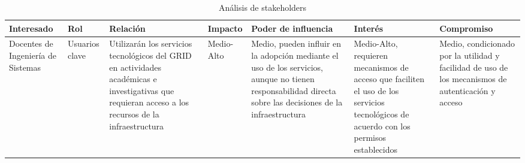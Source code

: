 \begin{table}[H]
	\centering
	\caption{Análisis de stakeholders}
	\label{tab:stakeholders}

	\renewcommand{\arraystretch}{1.25}
	\setlength{\tabcolsep}{4pt}
	\fontsize{7pt}{7pt}\selectfont

	\begin{tabularx}{\textwidth}{|
		>{\raggedright\arraybackslash}p{2.0cm}|
		>{\raggedright\arraybackslash}p{1.7cm}|
		>{\raggedright\arraybackslash}X|
		>{\raggedright\arraybackslash}p{1.5cm}|
		>{\raggedright\arraybackslash}X|
		>{\raggedright\arraybackslash}X|
		>{\raggedright\arraybackslash}p{2.0cm}|}

		\hline
		\textbf{Interesado}                                                                                                                                          &
		\textbf{Rol}                                                                                                                                                 &
		\textbf{Relación}                                                                                                                                            &
		\textbf{Impacto}                                                                                                                                             &
		\textbf{Poder de influencia}                                                                                                                                 &
		\textbf{Interés}                                                                                                                                             &
		\textbf{Compromiso}
		\\
		\hline

		Docentes de Ingeniería de Sistemas                                                                                                                           &
		Usuarios clave                                                                                                                                               &
		Utilizarán los servicios tecnológicos del \acs{GRID} en actividades académicas e investigativas que requieran acceso a los recursos de la infraestructura          &
		Medio-Alto                                                                                                                                                   &
		Medio, pueden influir en la adopción mediante el uso de los servicios, aunque no tienen responsabilidad directa sobre las decisiones de la infraestructura   &
		Medio-Alto, requieren mecanismos de acceso que faciliten el uso de los servicios tecnológicos de acuerdo con los permisos establecidos                       &
		Medio, condicionado por la utilidad y facilidad de uso de los mecanismos de autenticación y acceso
		\\
		\hline


\end{tabularx}
\end{table}
